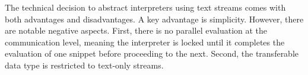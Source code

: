 \documentclass[letterpaper,12pt,twocolumn]{article}
\begin{document}
\begin{comment}

Lets write the "Discussion" section. of the paper. Please check the grammar of
the following points and make a linked narrative out of them. Please use Latex
markup.

---

The technical decision to abstract interpreters using text streams has its
positive and negative sides. While simplicity is the obvious bonus, the negatvie
consequences can be groouped into (1) No parallel evaluation at the
communication level. Th interpreter gets locked until it finishes evaluation of
one snippet before it can proceed to another one. (2) Transferrable data type is
limited to text-only streams.

We argue that the lack of parallel execution at the communication level can be
compensated by using interpreter-specific parallelism where and if it is
supported. For example, Python programs can use all sort of subprocess
utilities while shell programs have full access to shell job control.

Restricting streams to text-only data type seems to be a more funcdamental
limitation. Litrepl lifts this limitation by supporting text-only document
formats. Both Latex and Markdown have means of including rich data but they
don't encode these data directly. Instead they rely on side channels: file
system or network for referring such objects. Litrepl shares both pros such as
good representation in well-known version control systems, and cons, e.g.
requirement to organize such a side-channel data transfer explicitly.

Another controversial technical solution - to transfer the whole document at
input and output - can have performance penalties. In our experience the system
works sufficienlty good for few-thousand line documents, but for larger
documents delays might become uncomfortable even on modern computers. Still we
prefer to keep this interface to make editor integration as simple as possible:
typical plugin can just pipe the whole document through the tool using few lines
of code.

In addition, we allow a more performant integrations which take responsibility
for pre-parsing and piping only the relevant parts of the document. For these
approach, Litrepl offers \verb|print-regexp| command printing the anchor regexp
in a few common formats.
\end{comment}

The technical decision to abstract interpreters using text streams comes with
both advantages and disadvantages. A key advantage is simplicity. However, there
are notable negative aspects. First, there is no parallel evaluation at the
communication level, meaning the interpreter is locked until it completes the
evaluation of one snippet before proceeding to the next. Second, the
transferable data type is restricted to text-only streams.
\end{document}
